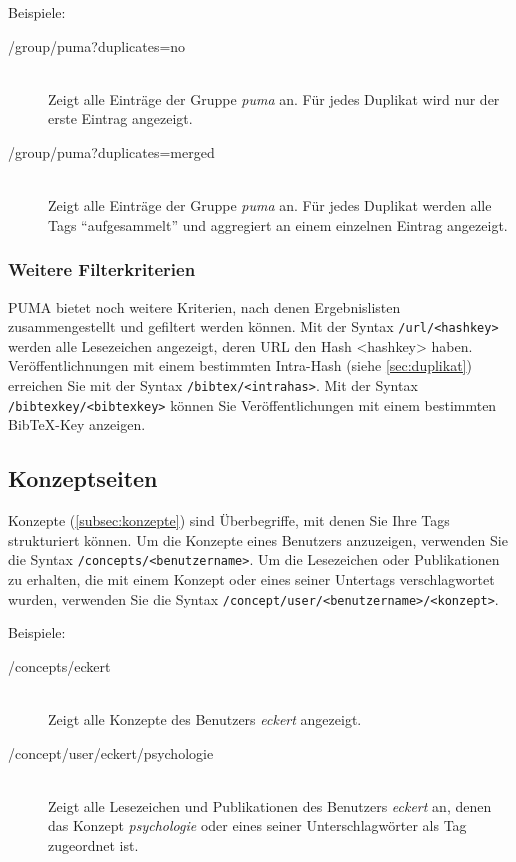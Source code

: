 Beispiele:
\begin{description}
    \item [/group/puma?duplicates=no] \hfill \\
    Zeigt alle Einträge der Gruppe \textit{puma} an. Für jedes Duplikat wird nur der erste Eintrag angezeigt.
    \item [/group/puma?duplicates=merged] \hfill \\
    Zeigt alle Einträge der Gruppe \textit{puma} an. Für jedes Duplikat werden alle Tags \enquote{aufgesammelt} und aggregiert an einem einzelnen Eintrag angezeigt.
\end{description}

\subsubsection{Weitere Filterkriterien}
\label{sss:weitereKriterien}

PUMA bietet noch weitere Kriterien, nach denen Ergebnislisten zusammengestellt und gefiltert werden können. Mit der Syntax \texttt{/url/<hashkey>} werden alle Lesezeichen angezeigt, deren URL den Hash <hashkey> haben. Veröffentlichnungen mit einem bestimmten Intra-Hash (siehe \autoref{sec:duplikat}) erreichen Sie mit der Syntax \texttt{/bibtex/<intrahas>}. Mit der Syntax \texttt{/bibtexkey/<bibtexkey>} können Sie Veröffentlichungen mit einem bestimmten BibTeX-Key anzeigen.



\subsection{Konzeptseiten}
\label{subsec:konzeptseiten}
Konzepte (\autoref{subsec:konzepte}) sind Überbegriffe, mit denen Sie Ihre Tags strukturiert können. Um die Konzepte eines Benutzers anzuzeigen, verwenden Sie die Syntax \texttt{/concepts/<benutzername>}. Um die Lesezeichen oder Publikationen zu erhalten, die mit einem Konzept oder eines seiner Untertags verschlagwortet wurden, verwenden Sie die Syntax \texttt{/concept/user/<benutzername>/<konzept>}.

Beispiele:
\begin{description}
    \item [/concepts/eckert] \hfill \\
    Zeigt alle Konzepte des Benutzers \textit{eckert} angezeigt.
    \item [/concept/user/eckert/psychologie] \hfill \\
    Zeigt alle Lesezeichen und Publikationen des Benutzers \textit{eckert} an, denen das Konzept \textit{psychologie} oder eines seiner Unterschlagwörter als Tag zugeordnet ist. 
\end{description}

